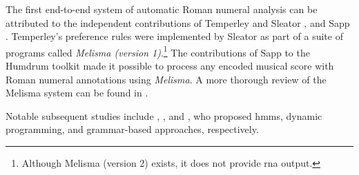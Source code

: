 

The first end-to-end system of automatic Roman numeral
analysis can be attributed to the independent contributions
of Temperley and Sleator \parencite{temperley2004cognition},
and Sapp \parencite{sapp2009tsroot}. Temperley's preference
rules were implemented by Sleator as part of a suite of
programs called \emph{Melisma (version
1)}.\footnote{Although Melisma (version 2) exists, it does
not provide \gls{rna} output.} The
contributions of Sapp to the Humdrum toolkit
\parencite{huron2002music} made it possible to process any
encoded musical score with Roman numeral annotations using
\emph{Melisma}. A more thorough review of the Melisma system
can be found in \textcite{napoleslopez2017automatic}.

Notable subsequent studies include
\textcite{raphael2004functional},
\textcite{illescas2007harmonic}, and
\textcite{magalhaes2011functional}, who proposed \glspl{hmm}, dynamic programming, and grammar-based
approaches, respectively.

